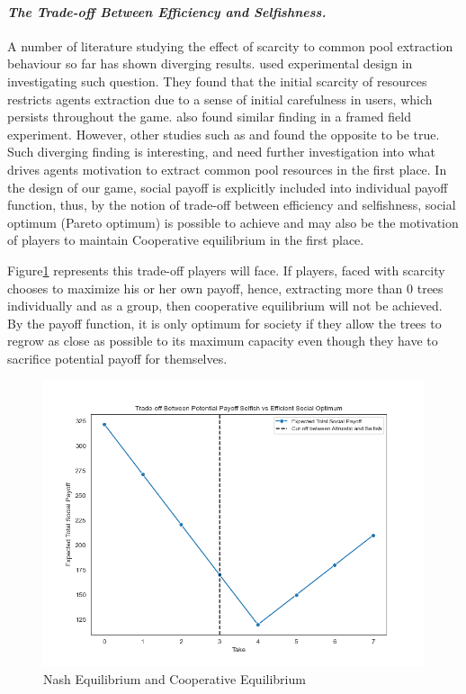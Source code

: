 \paragraph{\textit{The Trade-off Between Efficiency and Selfishness.}} A number of literature studying the effect of scarcity to common pool extraction behaviour so far has shown diverging results. \citet{oses2008environmental} used experimental design in investigating such question. They found that the initial scarcity of resources restricts agents extraction due to a sense of initial carefulness in users, which persists throughout the game. \citet{hoenow2021does} also found similar finding in a framed field experiment. However, other studies such as \citet{maldonado2009does} and \citet{pfaff2015framed} found the opposite to be true. Such diverging finding is interesting, and need further investigation into what drives agents motivation to extract common pool resources in the first place. In the design of our game, social payoff is explicitly included into individual payoff function, thus, by the notion of trade-off between efficiency and selfishness, social optimum (Pareto optimum) is possible to achieve and may also be the motivation of players to maintain Cooperative equilibrium in the first place.

\noindent Figure\ref{fig:tradeoff4} represents this trade-off players will face. If players, faced with scarcity chooses to maximize his or her own payoff, hence, extracting more than 0 trees individually and as a group, then cooperative equilibrium will not be achieved. By the payoff function, it is only optimum for society if they allow the trees to regrow as close as possible to its maximum capacity even though they have to sacrifice potential payoff for themselves.
\begin{figure}[H]
  \centering
  \includegraphics[width=0.8\linewidth]{../bld/graphs/0.Tradeoff3.png}
  \caption{Nash Equilibrium and Cooperative Equilibrium}\label{fig:tradeoff4}
\end{figure}

